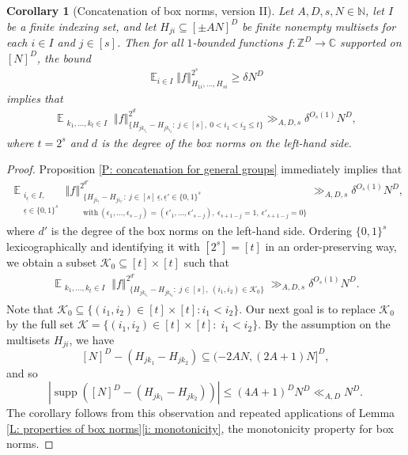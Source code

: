 \documentclass[11pt]{amsart}
\newtheorem{corollary}[lemma]{Corollary}
\theoremstyle{definition}
\DeclareMathOperator*{\E}{\mathbb{E}}
\newcommand{\C}{{\mathbb C}}
\newcommand{\N}{{\mathbb N}}
\newcommand{\Z}{{\mathbb Z}}
\newcommand{\CK}{{\mathcal K}}
\newcommand{\ueps}{{\underline{\epsilon}}}
\DeclareMathOperator{\supp}{supp}
\newcommand{\norm}[1]{\left\Vert #1\right\Vert}
\newcommand{\abs}[1]{\mathopen{}\left| #1\mathclose{}\right|}
\begin{document}
\begin{corollary}[Concatenation of box norms, version II]\label{C: concatenation for general groups III}
    Let $A, D, s,N\in\N$, let $I$ be a finite indexing set, and let $H_{ji}\subseteq [\pm AN]^D$ be finite nonempty multisets for each $i\in I$ and $j\in[s]$. Then for all $1$-bounded functions $f:\Z^D\to\C$ supported on $[N]^D$, the bound
    \begin{align*}
        \E_{i\in I}\norm{f}_{H_{1i}, \ldots, H_{si}}^{2^{s}}\geq \delta N^D
    \end{align*}
    implies that
    \begin{align}\label{E: concatenation simplified}
        \E_{\substack{k_1, \ldots, k_{t}\in I}}\norm{f}_{\{H_{j k_{i_1}}-H_{j k_{i_2}}:\ j\in[s],\ 0<i_1<i_2\leq t\}}^{2^d}\gg_{A, D, s} \delta^{O_s(1)} N^D,
    \end{align}
    where $t=2^s$ and $d$ is the degree of the box norms on the left-hand side. 
\end{corollary}
\begin{proof}
    Proposition \ref{P: concatenation for general groups} immediately implies that
    \begin{align*}
        \E_{\substack{i_\ueps\in I,\\ \ueps\in\{0,1\}^s}}\norm{f}_{\substack{\{H_{j i_\ueps}-H_{j i_{\ueps'}}:\ j\in[s]\ \ueps,\ueps'\in\{0,1\}^s\\ \mathrm{with}\ (\epsilon_1, \ldots,  \epsilon_{s-j}) = (\epsilon'_1, \ldots,  \epsilon'_{s-j}),\ \epsilon_{s+1-j}=1,\ \epsilon'_{s+1-j} = 0\}}}^{2^{d'}} \gg_{A, D, s} \delta^{O_s(1)}N^D,
    \end{align*}
    where $d'$ is the degree of the box norms on the left-hand side. Ordering $\{0,1\}^s$ lexicographically and identifying it with $[2^s]=[t]$ in an order-preserving way, we obtain a subset $\CK_0\subseteq[t]\times[t]$ such that
    \begin{align*}
        \E_{\substack{k_1, \ldots, k_t\in I}}\norm{f}_{\substack{\{H_{j k_{i_1}}-H_{j k_{i_2}}:\; j\in[s],\ ({i_1}, {i_2})\in\CK_0\}}}^{2^{d'}} \gg_{A, D, s} \delta^{O_s(1)}N^D.
    \end{align*}    
    Note that $\CK_0 \subseteq \{(i_1,i_2) \in [t]\times [t]: i_1<i_2\}$.  Our next goal is to replace $\CK_0$ by the full set $\CK = \{(i_1, i_2)\in[t]\times[t]:\; i_1<i_2\}$.
    By the assumption on the multisets $H_{ji}$, we have
    $$[N]^D - (H_{j k_1}-H_{j k_2})\subseteq (-2A N, (2A+1)N]^D,$$ and so $$\abs{\supp([N]^D - (H_{j k_1}-H_{j k_2}))}\leq (4A+1)^D N^D\ll_{A, D} N^D.$$  The corollary follows from this observation and repeated applications of Lemma \ref{L: properties of box norms}\eqref{i: monotonicity}, the monotonicity property for box norms.
\end{proof}
\end{document}
